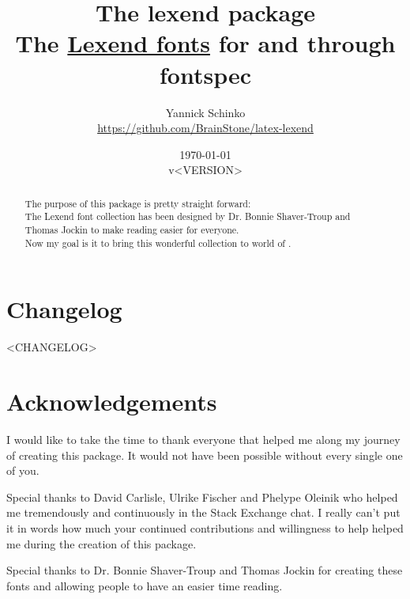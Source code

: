 \documentclass[oneside,a4paper]{ltxdoc}
\begin{document}
\title{
	The \textsf{lexend} package\\
	\large{The \href{https://www.lexend.com/}{\textsf{Lexend} fonts} for  and
	 through \textsf{fontspec}}
}
\author{
	Yannick Schinko\\
	\url{https://github.com/BrainStone/latex-lexend}
}
\date{
	\today\\
	v<VERSION>
}

\maketitle

\bigskip

\begin{abstract}
The purpose of this package is pretty straight forward:\\
The Lexend font collection has been designed by Dr. Bonnie Shaver-Troup and Thomas Jockin to make
reading easier for everyone.\\
Now my goal is it to bring this wonderful collection to world of .
\end{abstract}

\bigskip
\tableofcontents
\newpage


\section{Changelog}

<CHANGELOG>

\section{Acknowledgements}

I would like to take the time to thank everyone that helped me along my journey of creating this
package. It would not have been possible without every single one of you.

Special thanks to David Carlisle, Ulrike Fischer and Phelype Oleinik who helped me tremendously and
continuously in the  Stack Exchange chat. I really can't put it in words how much your
continued contributions and willingness to help helped me during the creation of this package.

Special thanks to Dr. Bonnie Shaver-Troup and Thomas Jockin for creating these fonts and allowing
people to have an easier time reading.
\end{document}
